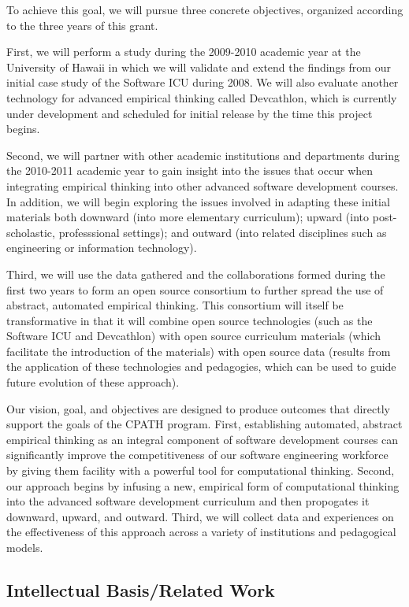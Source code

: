 To achieve this goal, we will pursue three concrete objectives, organized
according to the three years of this grant.  

First, we will perform a study during the 2009-2010 academic year at the
University of Hawaii in which we will validate and extend the findings from
our initial case study of the Software ICU during 2008.  We will also
evaluate another technology for advanced empirical thinking called
Devcathlon, which is currently under development and scheduled for initial
release by the time this project begins.

Second, we will partner with other academic institutions and departments
during the 2010-2011 academic year to gain insight into the issues that
occur when integrating empirical thinking into other advanced software
development courses.  In addition, we will begin exploring the issues
involved in adapting these initial materials both downward (into more
elementary curriculum); upward (into post-scholastic, professsional
settings); and outward (into related disciplines such as engineering or
information technology).

Third, we will use the data gathered and the collaborations formed during
the first two years to form an open source consortium to further spread the
use of abstract, automated empirical thinking.  This consortium will itself
be transformative in that it will combine open source technologies (such as
the Software ICU and Devcathlon) with open source curriculum materials
(which facilitate the introduction of the materials) with open source data
(results from the application of these technologies and pedagogies, which
can be used to guide future evolution of these approach).

Our vision, goal, and objectives are designed to produce outcomes that
directly support the goals of the CPATH program.  First, establishing
automated, abstract empirical thinking as an integral component of software
development courses can significantly improve the competitiveness of our
software engineering workforce by giving them facility with a powerful tool
for computational thinking.  Second, our approach begins by infusing a new,
empirical form of computational thinking into the advanced software
development curriculum and then propogates it downward, upward, and
outward.  Third, we will collect data and experiences on the effectiveness
of this approach across a variety of institutions and pedagogical models.

\subsection*{Intellectual Basis/Related Work}


